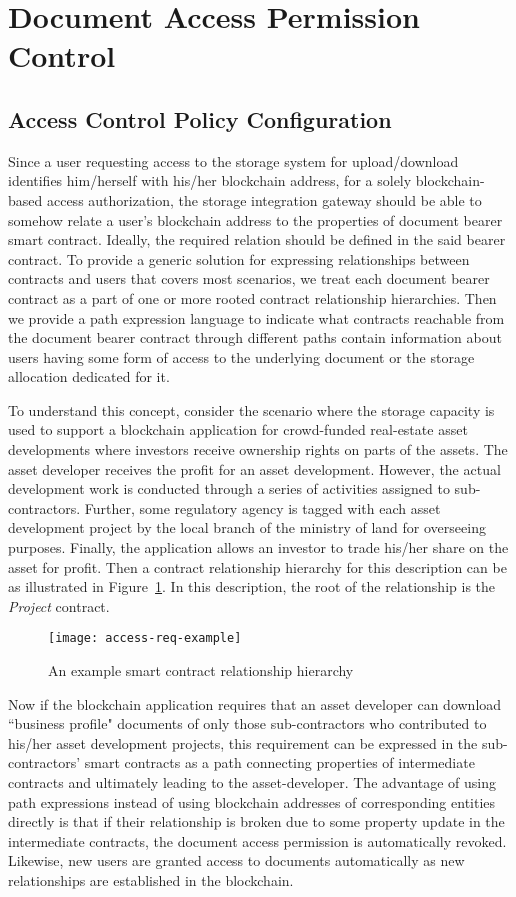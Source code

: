 
\section{Document Access Permission Control}
\label{s-accr}
\subsection{Access Control Policy Configuration}
Since a user requesting access to the storage system for upload/download identifies him/herself with his/her blockchain address, for a solely blockchain-based access authorization, the storage integration gateway should be able to somehow relate a user's blockchain address to the properties of document bearer smart contract. Ideally, the required relation should be defined in the said bearer contract. To provide a generic solution for expressing relationships between contracts and users that covers most scenarios, we treat each document bearer contract as a part of one or more rooted contract relationship hierarchies. Then we provide a path expression language to indicate what contracts reachable from the document bearer contract through different paths contain information about users having some form of access to the underlying document or the storage allocation dedicated for it.     

To understand this concept, consider the scenario where the storage capacity is used to support a blockchain application for crowd-funded real-estate asset developments where investors receive ownership rights on parts of the assets. The asset developer receives the profit for an asset development. However, the actual development work is conducted through a series of activities assigned to sub-contractors. Further, some regulatory agency is tagged with each asset development project by the local branch of the ministry of land for overseeing purposes. Finally, the application allows an investor to trade his/her share on the asset for profit. Then a contract relationship hierarchy for this description can be as illustrated in Figure~\ref{fig-2}. In this description, the root of the relationship is the {\it Project} contract.

\begin{figure}[h]
\centering
\texttt{[image: access-req-example]}                    
\caption{An example smart contract relationship hierarchy}\label{fig-2}
\end{figure}
Now if the blockchain application requires that an asset developer can download ``business profile" documents of only those sub-contractors who contributed to his/her asset development projects, this requirement can be expressed in the sub-contractors' smart contracts as a path connecting properties of intermediate contracts and ultimately leading to the asset-developer. The advantage of using path expressions instead of using blockchain addresses of corresponding entities directly is that if their relationship is broken due to some property update in the intermediate contracts, the document access permission is automatically revoked. Likewise, new users are granted access to documents automatically     as new relationships are established in the blockchain.

